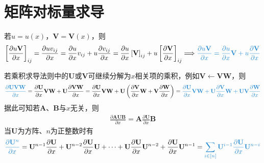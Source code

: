 \documentclass{ctexart}
\newcommand{\blue}[1]{\textcolor{Solarized-blue}{#1}}
\theoremstyle{definition}
\def \Av {\mathbf{A}}
\def \Bv {\mathbf{B}}
\def \Uv {\mathbf{U}}
\def \Vv {\mathbf{V}}
\def \Wv {\mathbf{W}}
\begin{document}
\section{矩阵对标量求导}

若$u = u(x)$，$\Vv = \Vv(x)$，则
\begin{align*}
    \left[ \frac{\partial u \Vv}{\partial x} \right]_{ij} = \frac{\partial u v_{ij}}{\partial x} = \frac{\partial u}{\partial x} v_{ij} + u \frac{\partial v_{ij}}{\partial x} = \frac{\partial u}{\partial x} \left[ \Vv \right]_{ij} + u \left[ \frac{\partial \Vv}{\partial x} \right]_{ij} \Longrightarrow \blue{\frac{\partial u \Vv}{\partial x} = \frac{\partial u}{\partial x} \Vv + u \frac{\partial \Vv}{\partial x}}
\end{align*}

若乘积求导法则中的$\Uv$或$\Vv$可继续分解为$x$相关项的乘积，例如$\Vv \leftarrow \Vv \Wv$，则
\begin{align} \label{eq: product}
    \blue{\frac{\partial \Uv \Vv \Wv}{\partial x}} = \frac{\partial \Uv}{\partial x} \Vv \Wv + \Uv \frac{\partial \Vv \Wv}{\partial x} = \frac{\partial \Uv}{\partial x} \Vv \Wv + \Uv \left( \frac{\partial \Vv}{\partial x} \Wv + \Vv \frac{\partial \Wv}{\partial x} \right) = \blue{\frac{\partial \Uv}{\partial x} \Vv \Wv + \Uv \frac{\partial \Vv}{\partial x} \Wv + \Uv \Vv \frac{\partial \Wv}{\partial x}}
\end{align}
据此可知若$\Av$、$\Bv$与$x$无关，则
\begin{align*}
    \frac{\partial \Av \Uv \Bv}{\partial x} = \Av \frac{\partial \Uv}{\partial x} \Bv
\end{align*}
当$\Uv$为方阵、$n$为正整数时有
\begin{align} \label{eq: power}
    \blue{\frac{\partial \Uv^n}{\partial x}} = \Uv^{n-1} \frac{\partial \Uv}{\partial x} + \Uv^{n-2} \frac{\partial \Uv}{\partial x} \Uv + \cdots + \Uv \frac{\partial \Uv}{\partial x} \Uv^{n-2} + \frac{\partial \Uv}{\partial x} \Uv^{n-1} = \blue{\sum_{i \in [n]} \Uv^{i-1} \frac{\partial \Uv}{\partial x} \Uv^{n-i}}
\end{align}
\end{document}
